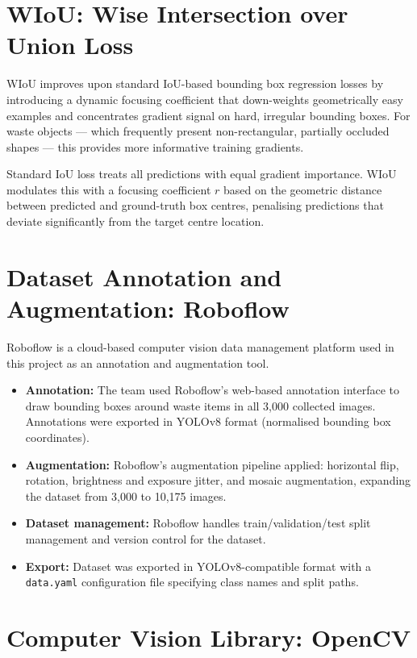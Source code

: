 \section{WIoU: Wise Intersection over Union Loss}

WIoU \cite{wiou2023} improves upon standard IoU-based bounding box regression losses by introducing a dynamic focusing coefficient that down-weights geometrically easy examples and concentrates gradient signal on hard, irregular bounding boxes. For waste objects — which frequently present non-rectangular, partially occluded shapes — this provides more informative training gradients.

Standard IoU loss treats all predictions with equal gradient importance. WIoU modulates this with a focusing coefficient $r$ based on the geometric distance between predicted and ground-truth box centres, penalising predictions that deviate significantly from the target centre location.

\section{Dataset Annotation and Augmentation: Roboflow}

Roboflow \cite{roboflow2024} is a cloud-based computer vision data management platform used in this project as an annotation and augmentation tool.

\begin{itemize}
    \item \textbf{Annotation:} The team used Roboflow's web-based annotation interface to draw bounding boxes around waste items in all 3,000 collected images. Annotations were exported in YOLOv8 format (normalised bounding box coordinates).
    \item \textbf{Augmentation:} Roboflow's augmentation pipeline applied: horizontal flip, rotation, brightness and exposure jitter, and mosaic augmentation, expanding the dataset from 3,000 to 10,175 images.
    \item \textbf{Dataset management:} Roboflow handles train/validation/test split management and version control for the dataset.
    \item \textbf{Export:} Dataset was exported in YOLOv8-compatible format with a \texttt{data.yaml} configuration file specifying class names and split paths.
\end{itemize}

\section{Computer Vision Library: OpenCV}

